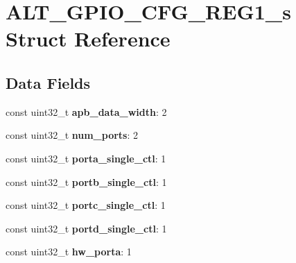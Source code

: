 \hypertarget{structALT__GPIO__CFG__REG1__s}{}\section{A\+L\+T\+\_\+\+G\+P\+I\+O\+\_\+\+C\+F\+G\+\_\+\+R\+E\+G1\+\_\+s Struct Reference}
\label{structALT__GPIO__CFG__REG1__s}
\subsection*{Data Fields}
\begin{DoxyCompactItemize}
\item 
\mbox{\label{structALT__GPIO__CFG__REG1__s_a8843ace4d6ed89151eafe938ef33e8b0}} 
const uint32\+\_\+t {\bfseries apb\+\_\+data\+\_\+width}\+: 2
\item 
\mbox{\label{structALT__GPIO__CFG__REG1__s_a91b37183a67522d1219b59bdf5be4283}} 
const uint32\+\_\+t {\bfseries num\+\_\+ports}\+: 2
\item 
\mbox{\label{structALT__GPIO__CFG__REG1__s_ae140571b080f638cb510060329ad93f9}} 
const uint32\+\_\+t {\bfseries porta\+\_\+single\+\_\+ctl}\+: 1
\item 
\mbox{\label{structALT__GPIO__CFG__REG1__s_a7db74877d42b865030909a4a1f28b27f}} 
const uint32\+\_\+t {\bfseries portb\+\_\+single\+\_\+ctl}\+: 1
\item 
\mbox{\label{structALT__GPIO__CFG__REG1__s_aaabd2d72a1fb279820fde718a7f597ba}} 
const uint32\+\_\+t {\bfseries portc\+\_\+single\+\_\+ctl}\+: 1
\item 
\mbox{\label{structALT__GPIO__CFG__REG1__s_ab608827f785e33a36bf7695dc5e0c4f9}} 
const uint32\+\_\+t {\bfseries portd\+\_\+single\+\_\+ctl}\+: 1
\item 
\mbox{\label{structALT__GPIO__CFG__REG1__s_a0bdb8223fccabcf0d9d81db11969ac13}} 
const uint32\+\_\+t {\bfseries hw\+\_\+porta}\+: 1
\item 
\mbox{\label{structALT__GPIO__CFG__REG1__s_abc875d88c5f744edfec87399fdd1f6c8}} 

\end{DoxyCompactItemize}
